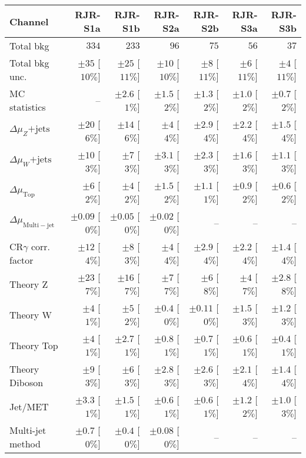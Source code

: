 \clearpage

\begin{table}[H]
\scriptsize
\begin{center}
\begin{tabular}{|lrrrrrr|}
\hline
Channel  &  \textbf{ RJR-S1a } & \textbf{ RJR-S1b } & \textbf{ RJR-S2a } & \textbf{ RJR-S2b } & \textbf{ RJR-S3a } & \textbf{ RJR-S3b }  \\ \hline
Total bkg  &  $334$  &  $233$  &  $96$  &  $75$  &  $56$  &  $37$ \\
Total bkg unc.  &  $\pm 35$  [$10\%$]  &  $\pm 25$  [$11\%$]  &  $\pm 10$  [$10\%$]  &  $\pm 8$  [$11\%$]  &  $\pm 6$  [$11\%$]  &  $\pm 4$  [$11\%$] \\
\hline
MC statistics  &   --    &  $\pm 2.6$ [$1\%$]  &  $\pm 1.5$ [$2\%$]  &  $\pm 1.3$ [$2\%$]  &  $\pm 1.0$ [$2\%$]  &  $\pm 0.7$ [$2\%$] \\
$\Delta\mu_Z\mathrm{+jets}$  &  $\pm 20$ [$6\%$]  &  $\pm 14$ [$6\%$]  &  $\pm 4$ [$4\%$]  &  $\pm 2.9$ [$4\%$]  &  $\pm 2.2$ [$4\%$]  &  $\pm 1.5$ [$4\%$] \\
$\Delta\mu_W\mathrm{+jets}$ &  $\pm 10$ [$3\%$]  &  $\pm 7$ [$3\%$]  &  $\pm 3.1$ [$3\%$]  &  $\pm 2.3$ [$3\%$]  &  $\pm 1.6$ [$3\%$]  &  $\pm 1.1$ [$3\%$] \\
$\Delta\mu_\mathrm{ Top}$  &  $\pm 6$ [$2\%$]  &  $\pm 4$ [$2\%$]  &  $\pm 1.5$ [$2\%$]  &  $\pm 1.1$ [$1\%$]  &  $\pm 0.9$ [$2\%$]  &  $\pm 0.6$ [$2\%$] \\
$\Delta\mu_\mathrm{ Multi-jet}$  &  $\pm 0.09$ [$0\%$]  &  $\pm 0.05$ [$0\%$]  &  $\pm 0.02$ [$0\%$]  &   --    &   --    &   --   \\
CR$\gamma$ corr. factor  &  $\pm 12$ [$4\%$]  &  $\pm 8$ [$3\%$]  &  $\pm 4$ [$4\%$]  &  $\pm 2.9$ [$4\%$]  &  $\pm 2.2$ [$4\%$]  &  $\pm 1.4$ [$4\%$] \\
Theory Z  &  $\pm 23$ [$7\%$]  &  $\pm 16$ [$7\%$]  &  $\pm 7$ [$7\%$]  &  $\pm 6$ [$8\%$]  &  $\pm 4$ [$7\%$]  &  $\pm 2.8$ [$8\%$] \\
Theory W  &  $\pm 4$ [$1\%$]  &  $\pm 5$ [$2\%$]  &  $\pm 0.4$ [$0\%$]  &  $\pm 0.11$ [$0\%$]  &  $\pm 1.5$ [$3\%$]  &  $\pm 1.2$ [$3\%$] \\
Theory Top   &  $\pm 4$ [$1\%$]  &  $\pm 2.7$ [$1\%$]  &  $\pm 0.8$ [$1\%$]  &  $\pm 0.7$ [$1\%$]  &  $\pm 0.6$ [$1\%$]  &  $\pm 0.4$ [$1\%$] \\
Theory Diboson  &  $\pm 9$ [$3\%$]  &  $\pm 6$ [$3\%$]  &  $\pm 2.8$ [$3\%$]  &  $\pm 2.6$ [$3\%$]  &  $\pm 2.1$ [$4\%$]  &  $\pm 1.4$ [$4\%$] \\
Jet/MET   &  $\pm 3.3$ [$1\%$]  &  $\pm 1.5$ [$1\%$]  &  $\pm 0.6$ [$1\%$]  &  $\pm 0.6$ [$1\%$]  &  $\pm 1.2$ [$2\%$]  &  $\pm 1.0$ [$3\%$] \\
Multi-jet method  &  $\pm 0.7$ [$0\%$]  &  $\pm 0.4$ [$0\%$]  &  $\pm 0.08$ [$0\%$]  &   --    &   --    &   --   \\
\hline
\end{tabular}


\end{center}
\end{table}
